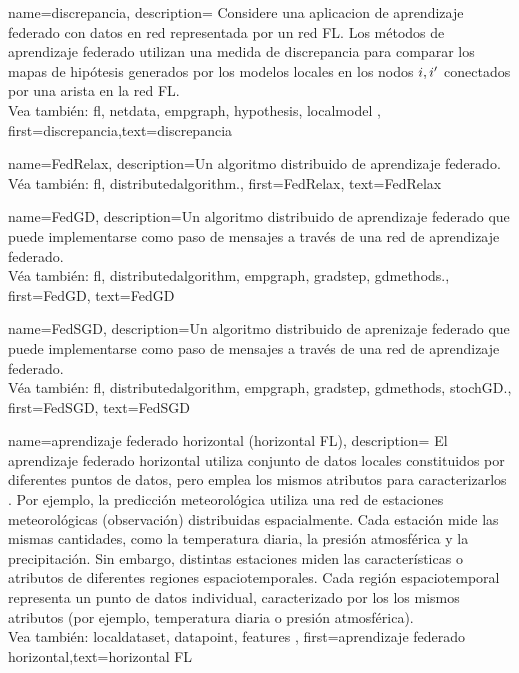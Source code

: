 {name=discrepancia,
	description={
		Considere una aplicacion de aprendizaje federado con datos en red 
		representada por un red FL. Los métodos de aprendizaje federado utilizan una medida de discrepancia para  
		comparar los mapas de hipótesis generados por los modelos locales en los nodos $i,i'$ 
		conectados por una arista en la red FL.
		\\
			Vea también: \gls{fl}, \gls{netdata}, \gls{empgraph}, \gls{hypothesis}, \gls{localmodel} },
	first={discrepancia},text={discrepancia}
}

{name={FedRelax},
	description={Un algoritmo distribuido de aprendizaje federado.\\ 
		Véa también: \gls{fl}, \gls{distributedalgorithm}.},
	first={FedRelax},
	text={FedRelax}
} 

{name={FedGD},
	description={Un algoritmo distribuido de aprendizaje federado que 
		puede implementarse como paso de mensajes a través de una red de aprendizaje federado.\\ 
		Véa también: \gls{fl}, \gls{distributedalgorithm}, \gls{empgraph}, \gls{gradstep}, \gls{gdmethods}.},
	first={FedGD},
	text={FedGD}
} 

{name={FedSGD},
	description={Un algoritmo distribuido de aprenizaje federado que 
		puede implementarse como paso de mensajes a través de una red de aprendizaje federado.\\ 
		Véa también: \gls{fl}, \gls{distributedalgorithm}, \gls{empgraph}, \gls{gradstep}, \gls{gdmethods}, \gls{stochGD}.},
	first={FedSGD},
	text={FedSGD}
} 


{name={aprendizaje federado horizontal (horizontal FL)},
	description={
		El aprendizaje federado horizontal utiliza conjunto de datos locales constituidos por diferentes
		puntos de datos, pero emplea los mismos atributos para caracterizarlos \cite{HFLChapter2020}.
		Por ejemplo, la predicción meteorológica utiliza una red de estaciones meteorológicas
		(observación) distribuidas espacialmente. Cada estación mide las mismas cantidades, como
		la temperatura diaria, la presión atmosférica y la precipitación. Sin embargo,
		distintas estaciones miden las características o atributos de diferentes regiones espaciotemporales.
		Cada región espaciotemporal representa un punto de datos individual, caracterizado por los los mismos atributos
		(por ejemplo, temperatura diaria o presión atmosférica).
		\\
			Vea también: \gls{localdataset}, \gls{datapoint}, \gls{feature}s },
	first={aprendizaje federado horizontal},text={horizontal FL}
}


